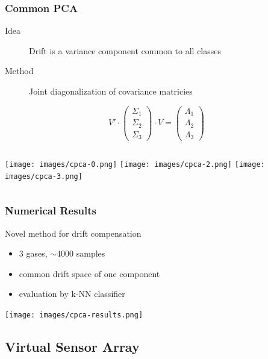 \documentclass{beamer}
\newcommand{\mancite}[1]{{\scriptsize{\textbf{\color{MainGreen}{[#1] }}}}}
\begin{document}
\begin{frame}
\frametitle{Common PCA}
\begin{description}
  \item[Idea] Drift is a variance component common to all classes
  \item[Method] Joint diagonalization of covariance matricies
\end{description}

\begin{equation*}
  V' \cdot 
  \begin{pmatrix} \Sigma_{1} \\ \Sigma_{2} \\ \Sigma_{3} \end{pmatrix} \cdot
  V = 
  \begin{pmatrix} \Lambda_{1} \\ \Lambda_{2} \\ \Lambda_{3} \end{pmatrix}
\end{equation*}

\begin{columns}
  \texttt{[image: images/cpca-0.png]}
  \texttt{[image: images/cpca-2.png]}
  \texttt{[image: images/cpca-3.png]}
\end{columns} 
  
\end{frame}

\begin{frame}
\frametitle{Numerical Results}
Novel method for drift compensation \mancite{Ziyatdinov et al., 2010}
\begin{itemize}
  \item 3 gases, $\sim$4000 samples
  \item common drift space of one component
  \item evaluation by k-NN classifier 
\end{itemize}

\begin{center}
  \texttt{[image: images/cpca-results.png]}
\end{center}
\end{frame}

  
\subsection{Virtual Sensor Array}
\end{document}
